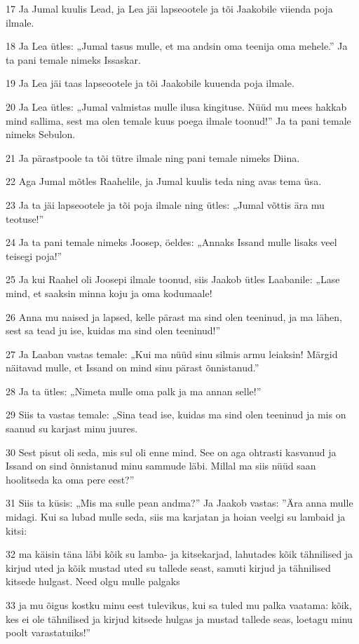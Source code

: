 \par 17 Ja Jumal kuulis Lead, ja Lea jäi lapseootele ja tõi Jaakobile viienda poja ilmale.
\par 18 Ja Lea ütles: „Jumal tasus mulle, et ma andsin oma teenija oma mehele.” Ja ta pani temale nimeks Issaskar.
\par 19 Ja Lea jäi taas lapseootele ja tõi Jaakobile kuuenda poja ilmale.
\par 20 Ja Lea ütles: „Jumal valmistas mulle ilusa kingituse. Nüüd mu mees hakkab mind sallima, sest ma olen temale kuus poega ilmale toonud!” Ja ta pani temale nimeks Sebulon.
\par 21 Ja pärastpoole ta tõi tütre ilmale ning pani temale nimeks Diina.
\par 22 Aga Jumal mõtles Raahelile, ja Jumal kuulis teda ning avas tema üsa.
\par 23 Ja ta jäi lapseootele ja tõi poja ilmale ning ütles: „Jumal võttis ära mu teotuse!”
\par 24 Ja ta pani temale nimeks Joosep, öeldes: „Annaks Issand mulle lisaks veel teisegi poja!”
\par 25 Ja kui Raahel oli Joosepi ilmale toonud, siis Jaakob ütles Laabanile: „Lase mind, et saaksin minna koju ja oma kodumaale!
\par 26 Anna mu naised ja lapsed, kelle pärast ma sind olen teeninud, ja ma lähen, sest sa tead ju ise, kuidas ma sind olen teeninud!”
\par 27 Ja Laaban vastas temale: „Kui ma nüüd sinu silmis armu leiaksin! Märgid näitavad mulle, et Issand on mind sinu pärast õnnistanud.”
\par 28 Ja ta ütles: „Nimeta mulle oma palk ja ma annan selle!”
\par 29 Siis ta vastas temale: „Sina tead ise, kuidas ma sind olen teeninud ja mis on saanud su karjast minu juures.
\par 30 Sest pisut oli seda, mis sul oli enne mind. See on aga ohtrasti kasvanud ja Issand on sind õnnistanud minu sammude läbi. Millal ma siis nüüd saan hoolitseda ka oma pere eest?”
\par 31 Siis ta küsis: „Mis ma sulle pean andma?” Ja Jaakob vastas: ”Ära anna mulle midagi. Kui sa lubad mulle seda, siis ma karjatan ja hoian veelgi su lambaid ja kitsi:
\par 32 ma käisin täna läbi kõik su lamba- ja kitsekarjad, lahutades kõik tähnilised ja kirjud uted ja kõik mustad uted su tallede seast, samuti kirjud ja tähnilised kitsede hulgast. Need olgu mulle palgaks
\par 33 ja mu õigus kostku minu eest tulevikus, kui sa tuled mu palka vaatama: kõik, kes ei ole tähnilised ja kirjud kitsede hulgas ja mustad tallede seas, loetagu minu poolt varastatuiks!”
